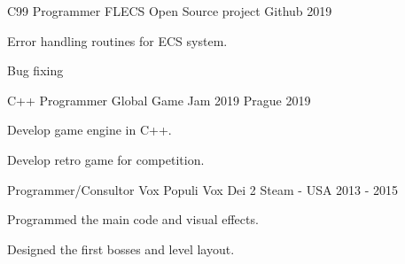 

\begin{cventries}

  \cventry
  {C99 Programmer} %
  {FLECS Open Source project} %
  {Github} %
  {2019} %
  {
  \begin{cvitems} %
    \item {Error handling routines for ECS system.}
    \item {Bug fixing}
  \end{cvitems}
  }

  \cventry
  {C++ Programmer} %
  {Global Game Jam 2019} %
  {Prague} %
  {2019} %
  {
  \begin{cvitems} %
    \item {Develop game engine in C++.}
    \item {Develop retro game for competition.}
  \end{cvitems}
  }

  \cventry
    {Programmer/Consultor} %
    {Vox Populi Vox Dei 2} %
    {Steam - USA} %
    {2013 - 2015} %
    {
      \begin{cvitems} %
        \item {Programmed the main code and visual effects.}
        \item {Designed the first bosses and level layout.}
      \end{cvitems}
    }


\end{cventries}
